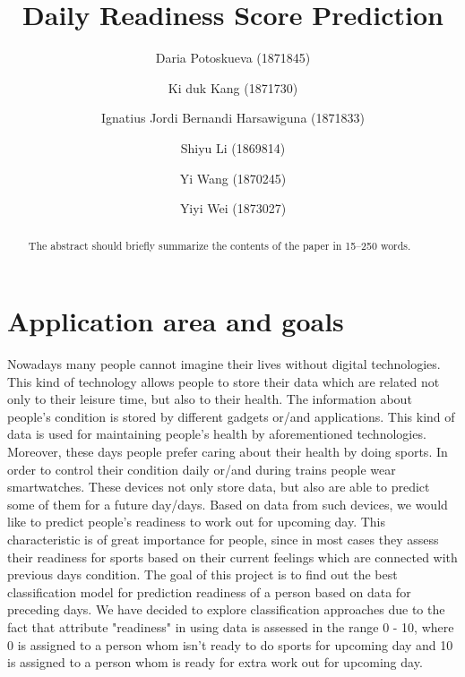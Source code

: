 \documentclass[runningheads]{llncs}
\begin{document}
%
\title{Daily Readiness Score Prediction}
%

\author{Daria Potoskueva (1871845)
\and Ki duk Kang (1871730)
\and
Ignatius Jordi Bernandi Harsawiguna (1871833)
\and
Shiyu Li (1869814)
\and
Yi Wang (1870245)
\and
Yiyi Wei (1873027)}
%
%
%
\maketitle              %
%
\begin{abstract}
The abstract should briefly summarize the contents of the paper in
15--250 words.

\end{abstract}
%
%
%
\section{Application area and goals}
Nowadays many people cannot imagine their lives without digital technologies. This kind of technology allows people to store their data which are related not only to their leisure time, but also to their health. The information about people's condition is stored by different gadgets or/and applications. This kind of data is used for maintaining people's health by aforementioned technologies. Moreover, these days people prefer caring about their health by doing sports. In order to control their condition daily or/and during trains people  wear smartwatches. These devices not only store data, but also are able to predict some of them for a future day/days. Based on data from such devices, we would like to predict people's readiness to work out for upcoming day. This characteristic is of great importance for people, since in most cases they assess their readiness for sports based on their current feelings which are connected with previous days condition. The goal of this project is to find out the best classification model for prediction readiness of a person based on data for preceding days. We have decided to explore classification approaches due to the fact that attribute "readiness" in using data is assessed in the range 0 - 10, where 0 is assigned to a person whom isn't ready to do sports for upcoming day and 10 is assigned to a person whom is ready for extra work out for upcoming day.
\end{document}
